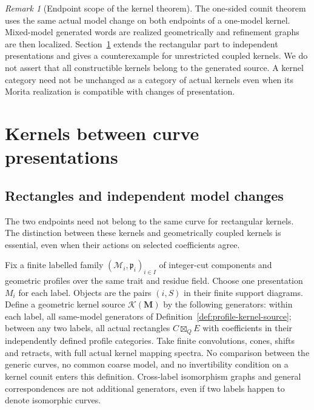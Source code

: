 \documentclass[11pt]{article}
\theoremstyle{definition}
\theoremstyle{remark}
\newtheorem{remark}[theorem]{Remark}
\begin{document}
\begin{remark}[Endpoint scope of the kernel theorem]
The one-sided counit theorem uses the same actual model change on
both endpoints of a one-model kernel.  Mixed-model generated words
are realized geometrically and refinement graphs are then localized.
Section~\ref{sec:independent-curves} extends the rectangular part to
independent presentations and gives a counterexample for unrestricted
coupled kernels. We do not assert that all constructible kernels
belong to the generated source.  A kernel category need not be
unchanged as a category of actual kernels even when its Morita
realization is compatible with changes of presentation.
\end{remark}

\section{Kernels between curve presentations}
\label{sec:independent-curves}
\subsection{Rectangles and independent model changes}
The two endpoints need not belong to the same curve for rectangular
kernels. The distinction between these kernels and geometrically
coupled kernels is essential, even when their actions on selected
coefficients agree.

Fix a finite labelled family $(\mathscr M_i,\mathfrak p_i)_{i\in I}$
of integer-cut components and geometric profiles over the same trait
and residue field. Choose one presentation $M_i$ for each label.
Objects are the pairs $(i,S)$ in their finite support diagrams.
Define a geometric kernel source $\mathcal K(\mathbf M)$ by the
following generators: within each label, all same-model generators
of Definition~\ref{def:profile-kernel-source}; between any two labels,
all actual rectangles $C\boxtimes_Q E$ with coefficients in their
independently defined profile categories. Take finite convolutions,
cones, shifts and retracts, with full actual kernel mapping spectra.
No comparison between the generic curves, no common coarse model,
and no invertibility condition on a kernel counit enters this
definition. Cross-label isomorphism graphs and general correspondences
are not additional generators, even if two labels happen to denote
isomorphic curves.
\end{document}

